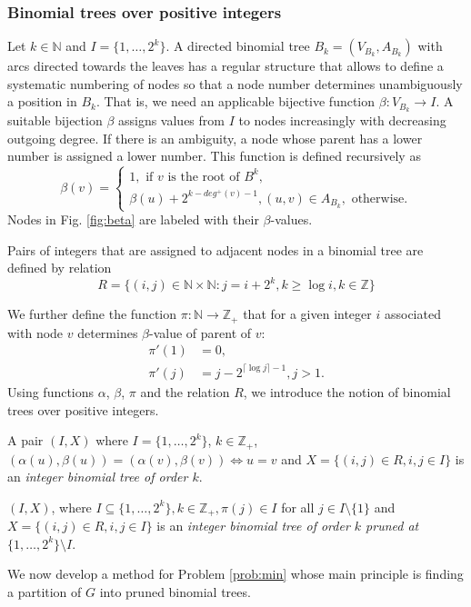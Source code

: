 \subsubsection{Binomial trees over positive integers}

Let $k\in \mathbb{N}$ and $I=\{1,\dots,2^k\}$. A directed binomial tree $B_k=(V_{B_k},A_{B_k})$ with arcs directed towards the leaves has a regular structure that allows to define a systematic numbering of nodes so that a node number determines unambiguously a position in $B_k$.
That is, we need an applicable bijective function $\beta:V_{B_k}\to I$.
A suitable bijection $\beta$ assigns values from $I$ to nodes increasingly with decreasing outgoing degree.
If there is an ambiguity, a node whose parent has a lower number is assigned a lower number.
This function is defined recursively as
\begin{equation}
\label{eq:beta}
\beta(v)=\begin{cases}
1,\text{ if } v \text{ is the root of } B^k,\\
\beta(u) + 2^{k-deg^+(v)-1}, (u,v)\in A_{B_k},\text{ otherwise}.
\end{cases}
\end{equation}
Nodes in Fig. \ref{fig:beta} are labeled with their $\beta$-values.

Pairs of integers that are assigned to adjacent nodes in a binomial tree are defined by relation
\begin{equation}
\label{eq:betarel}
R=\{(i,j)\in\mathbb{N}\times\mathbb{N}:j=i+2^k,k\geq\log i,k\in \mathbb{Z}\}
\end{equation}

We further define the function $\pi:\mathbb{N}\to\mathbb{Z}_+$ that for a given integer $i$ associated with node $v$
determines $\beta$-value of parent of $v$: 
\begin{align}
\label{eq:piprime}
\pi'(1)&=0, \\
\pi'(j)&=j-2^{\lceil\log j\rceil -1}, j > 1.
\end{align}
Using functions $\alpha$, $\beta$, $\pi$ and the relation $R$, we introduce the notion of binomial trees over positive integers.
\begin{definition}
A pair $(I,X)$ where $I=\{1,\dots,2^k\}$, $k\in\mathbb{Z}_+$, $(\alpha(u),\beta(u))=(\alpha(v),\beta(v))\Leftrightarrow u=v$ and
$X=\{(i,j)\in R, i,j\in I\}$ is an \emph{integer binomial tree of order $k$}. 

$(I,X)$, where $I\subseteq\{1,\dots,2^k\}, k\in \mathbb{Z}_+,\pi(j)\in I$ for all $j\in I\setminus\{1\}$ and
$X=\{(i,j)\in R, i,j\in I\}$ is an \emph{integer binomial tree of order $k$ pruned at $\{1,\dots,2^k\}\setminus I$}.
\end{definition}
We now develop a method for Problem \ref{prob:min} whose main principle is finding a partition of $G$ into pruned binomial trees.%


